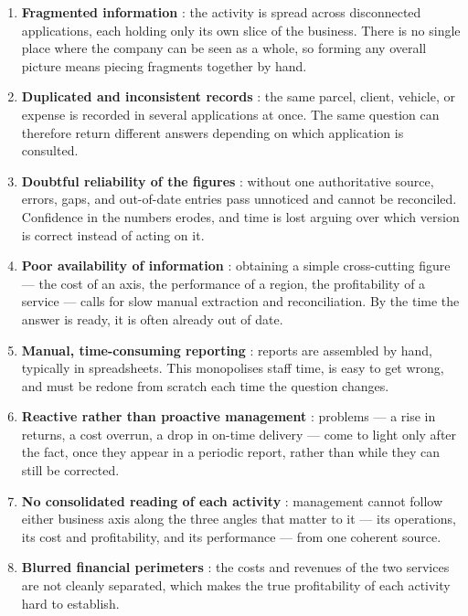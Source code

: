 \begin{enumerate}[label=\textbf{\arabic*.}]
    \item \textbf{Fragmented information} : the activity is spread across disconnected applications,
          each holding only its own slice of the business. There is no single place where the company
          can be seen as a whole, so forming any overall picture means piecing fragments together by
          hand.
    \item \textbf{Duplicated and inconsistent records} : the same parcel, client, vehicle, or expense
          is recorded in several applications at once. The same
          question can therefore return different answers depending on which application is consulted.
    \item \textbf{Doubtful reliability of the figures} : without one authoritative source, errors,
          gaps, and out-of-date entries pass unnoticed and cannot be reconciled. Confidence in the
          numbers erodes, and time is lost arguing over which version is correct instead of acting
          on it.
    \item \textbf{Poor availability of information} : obtaining a simple cross-cutting figure --- the
          cost of an axis, the performance of a region, the profitability of a service --- calls for
          slow manual extraction and reconciliation. By the time the answer is ready, it is often
          already out of date.
    \item \textbf{Manual, time-consuming reporting} : reports are assembled by hand, typically in
          spreadsheets. This monopolises staff time, is easy to get wrong, and must be redone from
          scratch each time the question changes.
    \item \textbf{Reactive rather than proactive management} : problems --- a rise in returns, a cost
          overrun, a drop in on-time delivery --- come to light only after the fact, once they appear
          in a periodic report, rather than while they can still be corrected.
    \item \textbf{No consolidated reading of each activity} : management cannot follow either business
          axis along the three angles that matter to it --- its operations, its cost and
          profitability, and its performance --- from one coherent source.
    \item \textbf{Blurred financial perimeters} : the costs and revenues of the two services are not
          cleanly separated, which makes the true profitability of each activity hard to establish.

\end{enumerate}
